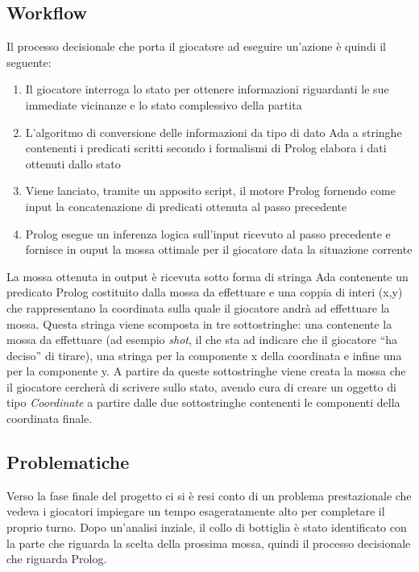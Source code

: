 \subsection{Workflow}
Il processo decisionale che porta il giocatore ad eseguire un'azione \`{e} quindi il seguente:
\begin{enumerate}
 \item Il giocatore interroga lo stato per ottenere informazioni riguardanti le sue immediate vicinanze e lo stato complessivo della partita
 \item L'algoritmo di conversione delle informazioni da tipo di dato Ada a stringhe contenenti i predicati scritti secondo i formalismi di Prolog elabora i dati ottenuti dallo stato
 \item Viene lanciato, tramite un apposito script, il motore Prolog fornendo come input la concatenazione di predicati ottenuta al passo precedente
 \item Prolog esegue un inferenza logica sull'input ricevuto al passo precedente e fornisce in ouput la mossa ottimale per il giocatore data la situazione corrente
 \end{enumerate} 
\noindent La mossa ottenuta in output \`{e} ricevuta sotto forma di stringa Ada contenente un predicato Prolog costituito dalla mossa da effettuare e una coppia di interi (x,y) che rappresentano la coordinata sulla quale il giocatore andr\`{a} ad effettuare la mossa. Questa stringa viene scomposta in tre sottostringhe: una contenente la mossa da effettuare (ad esempio \emph{shot}, il che sta ad indicare che il giocatore ``ha deciso'' di tirare), una stringa per la componente x della coordinata e infine una per la componente y. A partire da queste sottostringhe viene creata la mossa che il giocatore cercher\`{a} di scrivere sullo stato, avendo cura di creare un oggetto di tipo \emph{Coordinate} a partire dalle due sottostringhe contenenti le componenti della coordinata finale.

\subsection{Problematiche}
\label{sec:ai_problematiche}

Verso la fase finale del progetto ci si è resi conto di un problema prestazionale che vedeva i giocatori impiegare un tempo esageratamente alto per completare il proprio turno. Dopo un'analisi inziale, il collo di bottiglia è stato identificato con la parte che riguarda la scelta della prossima mossa, quindi il processo decisionale che riguarda Prolog.\\

